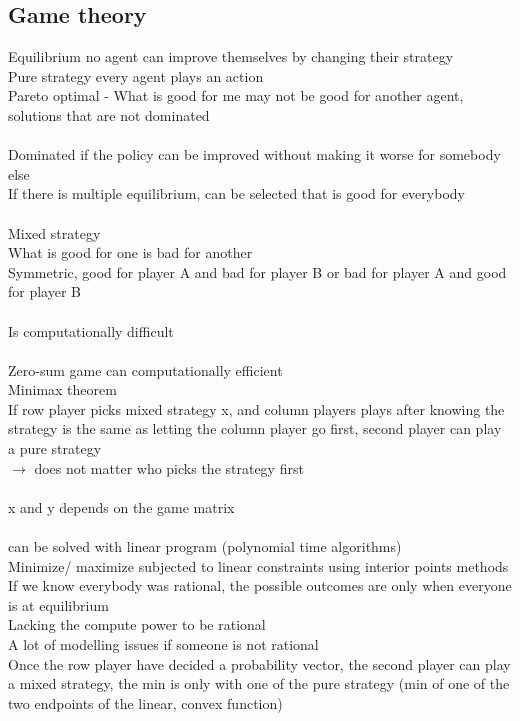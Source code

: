 \documentclass[11pt]{article}
\begin{document}
{\subsection*{Game theory}
Equilibrium no agent can improve themselves by changing their strategy
\\
Pure strategy every agent plays an action
\\
Pareto optimal - What is good for me may not be good for another agent, solutions that are not dominated\\
\\
Dominated if the policy can be improved without making it worse for somebody else
\\
If there is multiple equilibrium, can be selected that is good for everybody\\
\\
Mixed strategy\\
What is good for one is bad for another\\
Symmetric, good for player A and bad for player B
or bad for player A and good for player B \\
\\
Is computationally difficult
\\\\
Zero-sum game can computationally efficient
\\
Minimax theorem\\
If row player picks mixed strategy x, and column players plays after knowing the strategy is the same as letting the column player go first, second player can play a pure strategy\\
$\rightarrow$ does not matter who picks the strategy first\\
\\
x and y depends on the game matrix
\\\\
can be solved with linear program (polynomial time algorithms)
\\
Minimize/ maximize subjected to linear constraints using interior points methods
\\
If we know everybody was rational, the possible outcomes are only when everyone is at equilibrium
\\
Lacking the compute power to be rational
\\
A lot of modelling issues if someone is not rational
\\
Once the row player have decided a probability vector, the second player can play a mixed strategy, the min is only with one of the pure strategy (min of one of the two endpoints of the linear, convex function)
\\
}
\end{document}
